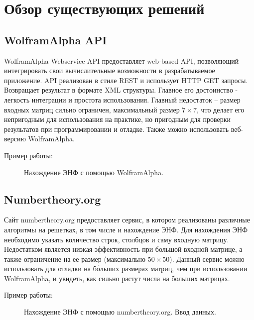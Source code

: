 \newpage

\section{Обзор существующих решений}

\subsection{WolframAlpha API}

WolframAlpha Webservice API предоставляет web-based API, позволяющий интегрировать свои вычислительные возможности в разрабатываемое приложение. API реализован в стиле REST и использует HTTP GET запросы. Возвращает результат в формате XML структуры. Главное его достоинство - легкость интеграции и простота использования. Главный недостаток -- размер входных матриц сильно ограничен, максимальный размер $ 7 \times 7 $, что делает его непригодным для использования на практике, но пригодным для проверки результатов при программировании и отладке. Также можно использовать веб-версию WolframAlpha.

Пример работы:

\begin{figure}[H]
\caption{Нахождение ЭНФ с помощью WolframAlpha.}
\label{fig:HNF_WA}
\end{figure}

\subsection{Numbertheory.org}

Сайт numbertheory.org предоставляет сервис, в котором реализованы различные алгоритмы на решетках, в том числе и нахождение ЭНФ. Для нахождения ЭНФ необходимо указать количество строк, столбцов и саму входную матрицу. Недостатком является низкая эффективность при большой входной матрице, а также ограничение на ее размер (максимально $ 50 \times 50 $). Данный сервис можно использовать для отладки на б\'ольших размерах матриц, чем при использовании WolframAlpha, и увидеть, как сильно растут числа на больших матрицах.

Пример работы:

\begin{figure}[H]
\caption{Нахождение ЭНФ с помощью numbertheory.org. Ввод данных.}
\label{fig:HNF_NT_INPUT}
\end{figure}

